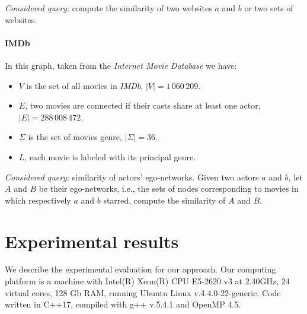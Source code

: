     
    \textsl{Considered query:} compute the similarity of two websites $a$ and $b$ or two sets of websites.
    
    \paragraph*{IMDb} In this graph, taken from the \textit{Internet Movie Database} we have:
    
    \begin{itemize}
    	\item $V$ is the set of all movies in \textit{IMDb},  $|V| = 1\,060\,209$.
		\item $E$, two movies are connected if their casts share at least one actor, $|E| = 288\,008\,472$.
		\item $\Sigma$ is the set of movies genre, $|\Sigma| = 36$.
		\item $L$, each movie is labeled with its principal genre.
    \end{itemize}
    
    
    \textsl{Considered query:} similarity of actors' ego-networks. Given two actors $a$ and $b$, let $A$ and $B$ be their ego-networks, i.e., the sets of nodes corresponding to movies in which respectively $a$ and $b$ starred, compute the similarity of $A$ and $B$.
    
    \section{Experimental results}

    We describe the experimental evaluation for our approach. Our computing platform is a machine with Intel(R) Xeon(R) CPU E5-2620 v3 at 2.40GHz, 24 virtual cores, 128 Gb RAM, running Ubuntu Linux v.4.4.0-22-generic. Code written in C++17, compiled with g++ v.5.4.1 and OpenMP 4.5.\\
    
